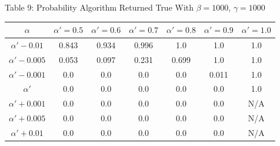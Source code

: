 \documentclass{article}
\begin{document}
\begin{center}
Table 9: Probability Algorithm Returned True With $\beta=1000$, $\gamma=1000$ \\
\begin{tabular}{|c|c|c|c|c|c|c|}
\hline
$\alpha$ & $\alpha' = 0.5$ & $\alpha' = 0.6$ & $\alpha' = 0.7$ & $\alpha' = 0.8$ & $\alpha' = 0.9$ & $\alpha' = 1.0$ \\
\hline
$\alpha' -0.01$ & 0.843 & 0.934 & 0.996 & 1.0 & 1.0 & 1.0 \\
\hline
$\alpha'-0.005$ & 0.053 & 0.097 & 0.231 & 0.699 & 1.0 & 1.0 \\
\hline
$\alpha'-0.001$ & 0.0 & 0.0 & 0.0 & 0.0 & 0.011 & 1.0 \\
\hline
$\alpha'$            & 0.0 & 0.0 & 0.0 & 0.0 & 0.0 & 1.0 \\
\hline
$\alpha'+0.001$ & 0.0 & 0.0 & 0.0 & 0.0 & 0.0 & N/A \\
\hline
$\alpha'+0.005$ & 0.0 & 0.0 & 0.0 & 0.0 & 0.0 & N/A \\
\hline
$\alpha'+0.01 $ & 0.0 & 0.0 & 0.0 & 0.0 & 0.0 & N/A \\
\hline
\end{tabular}
\end{center}
\end{document}
